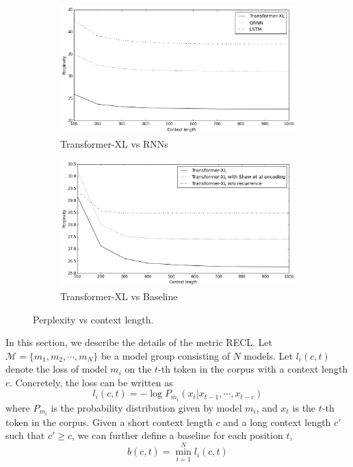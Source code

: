\begin{figure}[!h]
	\begin{subfigure}[b]{0.5\textwidth}
		\includegraphics[width=\textwidth]{FIG/compare2.png}
		\caption{Transformer-XL vs RNNs}
		\label{fig:vsrnn}
	\end{subfigure}
	\begin{subfigure}[b]{0.5\textwidth}
		\includegraphics[width=\textwidth]{FIG/compare3.png}
		\caption{Transformer-XL vs Baseline}
		\label{fig:vsbase}
	\end{subfigure}
	\caption{Perplexity vs context length.}
	\label{fig:context}
\end{figure}

In this section, we describe the details of the metric RECL. Let $\mathcal{M} = \{m_1, m_2, \cdots, m_N\}$ be a model group consisting of $N$ models. Let $l_i(c, t)$ denote the loss of model $m_i$ on the $t$-th token in the corpus with a context length $c$. Concretely, the loss can be written as
\[
l_i(c, t) = - \log P_{m_i}(x_t | x_{t - 1}, \cdots, x_{t - c})
\]
where $P_{m_i}$ is the probability distribution given by model $m_i$, and $x_t$ is the $t$-th token in the corpus. Given a short context length $c$ and a long context length $c'$ such that $c' \geq c$, we can further define a baseline for each position $t$,
\[b(c, t) = \min_{i = 1}^N l_i(c, t)\]

